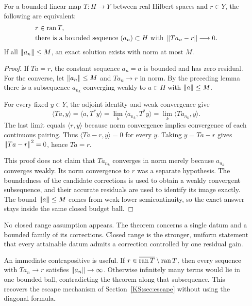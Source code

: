 \begin{KStheorem}\label{KS:WR01}
For a bounded linear map $T:H\to Y$ between real Hilbert spaces and $r\in Y$, the following are equivalent:
\[
 \begin{split}
 &r\in\operatorname{ran} T,\\
 &\text{there is a bounded sequence }(a_n)\subset H
       \text{ with }\left\lVert Ta_n-r\right\rVert\longrightarrow0.
 \end{split}
\]
If all $\left\lVert a_n\right\rVert\le M$, an exact solution exists with norm at most $M$.
\end{KStheorem}
\begin{proof}
If $Ta=r$, the constant sequence $a_n=a$ is bounded and has zero residual. For the converse, let $\left\lVert a_n\right\rVert\le M$ and $Ta_n\to r$ in norm. By the preceding lemma there is a subsequence $a_{n_k}$ converging weakly to $a\in H$ with $\left\lVert a\right\rVert\le M$.

For every fixed $y\in Y$, the adjoint identity and weak convergence give
\[
 \langle Ta,y\rangle
 =\langle a,T^*y\rangle
 =\lim_k\langle a_{n_k},T^*y\rangle
 =\lim_k\langle Ta_{n_k},y\rangle.
\]
The last limit equals $\langle r,y\rangle$ because norm convergence implies convergence of each continuous pairing. Thus $\langle Ta-r,y\rangle=0$ for every $y$. Taking $y=Ta-r$ gives $\left\lVert Ta-r\right\rVert^2=0$, hence $Ta=r$.

This proof does not claim that $Ta_{n_k}$ converges in norm merely because $a_{n_k}$ converges weakly. Its norm convergence to $r$ was a separate hypothesis. The boundedness of the candidate corrections is used to obtain a weakly convergent subsequence, and their accurate residuals are used to identify its image exactly. The bound $\left\lVert a\right\rVert\le M$ comes from weak lower semicontinuity, so the exact answer stays inside the same closed budget ball.
\end{proof}

No closed range assumption appears. The theorem concerns a single datum and a bounded family of its corrections. Closed range is the stronger, uniform statement that every attainable datum admits a correction controlled by one residual gain.

An immediate contrapositive is useful. If $r\in\overline{\operatorname{ran} T}\setminus\operatorname{ran} T$, then every sequence with $Ta_n\to r$ satisfies $\left\lVert a_n\right\rVert\to\infty$. Otherwise infinitely many terms would lie in one bounded ball, contradicting the theorem along that subsequence. This recovers the escape mechanism of Section~\ref{KS:sec:escape} without using the diagonal formula.

